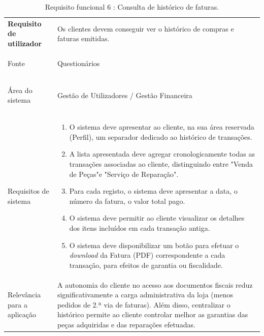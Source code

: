 \documentclass[a4paper,12pt]{scrreprt}
\begin{document}
\begin{table}[H]
    \centering
    \renewcommand{\arraystretch}{1.5} 
    
    \begin{tabular}{|>{\columncolor{gray!15}\bfseries}p{4cm}|p{10.5cm}|}
        \hline
        Requisito de utilizador & Os clientes devem conseguir ver o histórico de compras e faturas emitidas. \\ \hdashline
        
        Fonte & Questionários \\ \hdashline
        
        Área do sistema & Gestão de Utilizadores / Gestão Financeira \\ \hdashline
        
        Requisitos de sistema & 
        \begin{enumerate}[leftmargin=*, nosep, topsep=2pt, partopsep=0pt]
            \item O sistema deve apresentar ao cliente, na sua área reservada (Perfil), um separador dedicado ao histórico de transações.
            \item A lista apresentada deve agregar cronologicamente todas as transações associadas ao cliente, distinguindo entre "Venda de Peças"\space e "Serviço de Reparação".
            \item Para cada registo, o sistema deve apresentar a data, o número da fatura, o valor total pago.
            \item O sistema deve permitir ao cliente visualizar os detalhes dos itens incluídos em cada transação antiga.
            \item O sistema deve disponibilizar um botão para efetuar o \textit{download} da Fatura (PDF) correspondente a cada transação, para efeitos de garantia ou fiscalidade.
        \end{enumerate} \\ \hdashline
        
        Relevância para a aplicação & A autonomia do cliente no acesso aos documentos fiscais reduz significativamente a carga administrativa da loja (menos pedidos de 2.ª via de faturas). Além disso, centralizar o histórico permite ao cliente controlar melhor as garantias das peças adquiridas e das reparações efetuadas.\\ \hline
    \end{tabular}
    \caption{Requisito funcional 6 : Consulta de histórico de faturas.}
    \label{tab:rf_historico_faturas}
\end{table}
\end{document}
